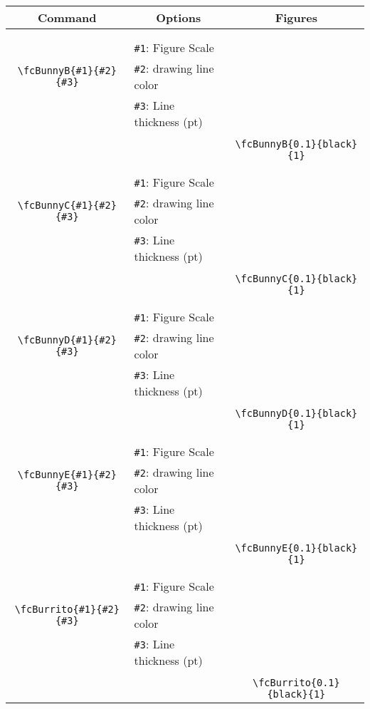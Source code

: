 \documentclass[x11names]{article}
\begin{document}
\begin{table}[H]\centering\begin{tabular}{|c|l|c|}\hline {\bf Command}& \multicolumn{1}{c|}{{\bf Options}} & {\bf Figures}\\  \hline	&&\multirow{5}{*}{\fcBunnyB{0.1}{black}{1}}\\	&&\\	&\verb|#1|: Figure Scale &\\	\verb|\fcBunnyB{#1}{#2}{#3}|&	\verb|#2|: drawing line color &\\	&\verb|#3|: Line thickness (pt) &\\ &&\\&&	\verb|\fcBunnyB{0.1}{black}{1}|\\\hline 	
	&&\multirow{5}{*}{\fcBunnyC{0.1}{black}{1}}\\	&&\\	&\verb|#1|: Figure Scale &\\	\verb|\fcBunnyC{#1}{#2}{#3}|&	\verb|#2|: drawing line color &\\	&\verb|#3|: Line thickness (pt) &\\ &&\\&&	\verb|\fcBunnyC{0.1}{black}{1}|\\\hline 	
	&&\multirow{5}{*}{\fcBunnyD{0.1}{black}{1}}\\	&&\\	&\verb|#1|: Figure Scale &\\	\verb|\fcBunnyD{#1}{#2}{#3}|&	\verb|#2|: drawing line color &\\	&\verb|#3|: Line thickness (pt) &\\ &&\\&&	\verb|\fcBunnyD{0.1}{black}{1}|\\\hline 	
	&&\multirow{5}{*}{\fcBunnyE{0.1}{black}{1}}\\	&&\\	&\verb|#1|: Figure Scale &\\	\verb|\fcBunnyE{#1}{#2}{#3}|&	\verb|#2|: drawing line color &\\	&\verb|#3|: Line thickness (pt) &\\ &&\\&&	\verb|\fcBunnyE{0.1}{black}{1}|\\\hline 	
	&&\multirow{5}{*}{\fcBurrito{0.1}{black}{1}}\\	&&\\	&\verb|#1|: Figure Scale &\\	\verb|\fcBurrito{#1}{#2}{#3}|&	\verb|#2|: drawing line color &\\	&\verb|#3|: Line thickness (pt) &\\ &&\\&&	\verb|\fcBurrito{0.1}{black}{1}|\\\hline 	

\end{tabular}
\end{table}
\end{document}
